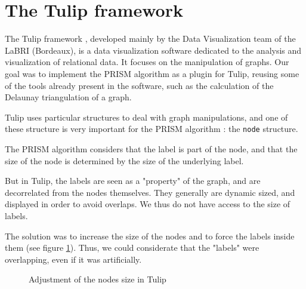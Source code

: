 \documentclass[12pt]{report}
\begin{document}
\section{The Tulip framework}

The Tulip framework \cite{Auber12}, developed mainly by the Data Visualization team of the LaBRI (Bordeaux), is a data visualization software dedicated to the analysis and visualization of relational data. It focuses on the manipulation of graphs. Our goal was to implement the PRISM algorithm as a plugin for Tulip, reusing some of the tools already present in the software, such as the calculation of the Delaunay triangulation of a graph.

Tulip uses particular structures to deal with graph manipulations, and one of these structure is very important for the PRISM algorithm : the \texttt{node} structure.

The PRISM algorithm considers that the label is part of the node, and that the size of the node is determined by the size of the underlying label.

But in Tulip, the labels are seen as a "property" of the graph, and are decorrelated from the nodes themselves. They generally are dynamic sized, and displayed in order to avoid overlaps. We thus do not have access to the size of labels.

The solution was to increase the size of the nodes and to force the labels inside them (see figure \ref{graphTulip}). Thus, we could considerate that the "labels" were overlapping, even if it was artificially.

\begin{figure}[h]
  \setlength\fboxsep{5pt}
  \setlength\fboxrule{0.5pt}
  \caption{Adjustment of the nodes size in Tulip}
  \label{graphTulip}
\end{figure}
\end{document}
